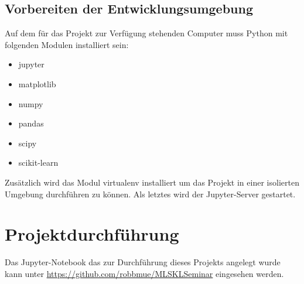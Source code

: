 \section{Vorbereiten der Entwicklungsumgebung}
\label{sec:vorbereitenEntwicklungsumgebung}
Auf dem für das Projekt zur Verfügung stehenden Computer muss Python mit folgenden Modulen installiert sein: 
\begin{itemize}
\item jupyter
\item matplotlib
\item numpy
\item pandas
\item scipy
\item scikit-learn
\end{itemize}
Zusätzlich wird das Modul virtualenv installiert um das Projekt in einer isolierten Umgebung durchführen zu können. Als letztes wird der Jupyter-Server gestartet.

\chapter{Projektdurchführung}
\label{chap:projektdurchführung}
Das Jupyter-Notebook das zur Durchführung dieses Projekts angelegt wurde kann unter \href{https://github.com/robbmue/MLSKLSeminar}{https://github.com/robbmue/MLSKLSeminar} eingesehen werden.

